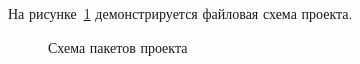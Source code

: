 
На рисунке~\ref{clean-arch-add} демонстрируется файловая схема проекта.

\begin{figure}
    
    \caption{Схема пакетов проекта}
    \label{clean-arch-add}
\end{figure}